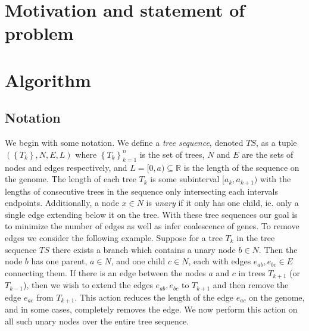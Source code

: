 \documentclass[10pt,twoside,lineno]{gsajnl}
\newcommand{\R}{\mathbb{R}}
\begin{document}
\section{Motivation and statement of problem}



\section{Algorithm}


\subsection*{Notation}
    We begin with some notation. We define a \textit{tree sequence}, denoted $TS$, 
    as a tuple $\left( \left\{T_k\right\}, N, E, L\right)$ where
     $\left\{T_k\right\}_{k=1}^n$ is the set of trees,
     $N$ and $E$ are the sets of nodes and edges respectively,
     and $L=[0,a)\subseteq \R$ is the length of the sequence on the genome.
     The length of each tree $T_k$ is some subinterval $[a_k,a_{k+1})$ 
     with the lengths of consecutive trees in the sequence 
     only intersecting each intervals endpoints. 
    Additionally, a node $x\in N$ is \textit{unary} if it only has one child, 
    ie. only a single edge extending below it on the tree.
    With these tree sequences our goal is to
    minimize the number of edges
    as well as infer coalescence of genes. 
    To remove edges we consider the following example.
    Suppose for a tree $T_k$ in the tree sequence $TS$ 
    there exists a branch which contains a unary node $b\in N$.
    Then the node $b$ has one parent, $a\in N$, 
    and one child $c\in N$,
    each with edges $e_{ab}, e_{bc}\in E$ connecting them.
    If there is an edge between the nodes $a$ and $c$ in trees 
    $T_{k+1}$ (or $T_{k-1}$),
    then we wish to extend the edges $e_{ab},e_{bc}$ 
    to $T_{k+1}$ and then remove the edge $e_{ac}$ from $T_{k+1}$. 
    This action reduces the length of the edge $e_{ac}$ on the genome,
    and in some cases, completely removes the edge. 
    We now perform this action on all such unary nodes 
    over the entire tree sequence.
\end{document}
